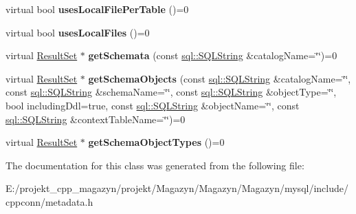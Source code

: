 \begin{DoxyCompactItemize}
virtual bool {\bfseries uses\+Local\+File\+Per\+Table} ()=0
\item 
\hypertarget{classsql_1_1_database_meta_data_ad974dedf8ef47609adba050e6c03861e}{}\label{classsql_1_1_database_meta_data_ad974dedf8ef47609adba050e6c03861e} 
virtual bool {\bfseries uses\+Local\+Files} ()=0
\item 
\hypertarget{classsql_1_1_database_meta_data_ab834b634719330f6d6c5352f388cf138}{}\label{classsql_1_1_database_meta_data_ab834b634719330f6d6c5352f388cf138} 
virtual \hyperlink{classsql_1_1_result_set}{Result\+Set} $\ast$ {\bfseries get\+Schemata} (const \hyperlink{classsql_1_1_s_q_l_string}{sql\+::\+S\+Q\+L\+String} \&catalog\+Name=\char`\"{}\char`\"{})=0
\item 
\hypertarget{classsql_1_1_database_meta_data_ab8914537accd737529fa4b47858d4b37}{}\label{classsql_1_1_database_meta_data_ab8914537accd737529fa4b47858d4b37} 
virtual \hyperlink{classsql_1_1_result_set}{Result\+Set} $\ast$ {\bfseries get\+Schema\+Objects} (const \hyperlink{classsql_1_1_s_q_l_string}{sql\+::\+S\+Q\+L\+String} \&catalog\+Name=\char`\"{}\char`\"{}, const \hyperlink{classsql_1_1_s_q_l_string}{sql\+::\+S\+Q\+L\+String} \&schema\+Name=\char`\"{}\char`\"{}, const \hyperlink{classsql_1_1_s_q_l_string}{sql\+::\+S\+Q\+L\+String} \&object\+Type=\char`\"{}\char`\"{}, bool including\+Ddl=true, const \hyperlink{classsql_1_1_s_q_l_string}{sql\+::\+S\+Q\+L\+String} \&object\+Name=\char`\"{}\char`\"{}, const \hyperlink{classsql_1_1_s_q_l_string}{sql\+::\+S\+Q\+L\+String} \&context\+Table\+Name=\char`\"{}\char`\"{})=0
\item 
\hypertarget{classsql_1_1_database_meta_data_acd8dc4886238099d69036185be9f1e47}{}\label{classsql_1_1_database_meta_data_acd8dc4886238099d69036185be9f1e47} 
virtual \hyperlink{classsql_1_1_result_set}{Result\+Set} $\ast$ {\bfseries get\+Schema\+Object\+Types} ()=0
\end{DoxyCompactItemize}


The documentation for this class was generated from the following file\+:\begin{DoxyCompactItemize}
\item 
E\+:/projekt\+\_\+cpp\+\_\+magazyn/projekt/\+Magazyn/\+Magazyn/\+Magazyn/mysql/include/cppconn/metadata.\+h\end{DoxyCompactItemize}
